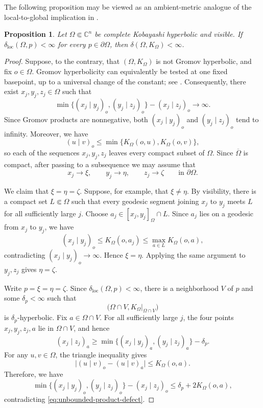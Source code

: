\documentclass[11pt]{article}
\newtheorem{proposition}[theorem]{Proposition}
\theoremstyle{definition}
\newcommand{\C}{\mathbb{C}}
\begin{document}
The following proposition may be viewed as an ambient-metric analogue
of the local-to-global implication in
\cite[Theorem~1.2]{BracciGaussierNikolovThomas}.
\begin{proposition}\label{prop:visible-local-to-global}
Let \(\Omega\Subset\C^n\) be complete Kobayashi hyperbolic and visible.
If \(\delta_{\mathrm{loc}}(\Omega,p)<\infty\) for every
\(p\in\partial\Omega\), then \(\delta(\Omega,K_\Omega)<\infty\).
\end{proposition}

\begin{proof}
Suppose, to the contrary, that \((\Omega,K_\Omega)\) is not Gromov
hyperbolic, and fix \(o\in\Omega\).
Gromov hyperbolicity can equivalently be tested at one fixed basepoint,
up to a universal change of the constant; see
\cite[Chapter~III.H]{BridsonHaefliger}.
Consequently, there exist \(x_j,y_j,z_j\in\Omega\) such that
\begin{equation}\label{eq:unbounded-product-defect}
\min\{(x_j\mid y_j)_o,(y_j\mid z_j)_o\}
-
(x_j\mid z_j)_o
\longrightarrow\infty.
\end{equation}
Since Gromov products are nonnegative, both
\((x_j\mid y_j)_o\) and \((y_j\mid z_j)_o\) tend to infinity.  Moreover, we have
\[
(u\mid v)_o
\le
\min\{K_\Omega(o,u),K_\Omega(o,v)\},
\]
so each of the sequences \(x_j,y_j,z_j\) leaves every compact subset of
\(\Omega\).  Since \(\overline\Omega\) is compact, after passing to a
subsequence we may assume that
\[
x_j\to\xi,\qquad
y_j\to\eta,\qquad
z_j\to\zeta
\qquad
\text{in }\partial\Omega.
\]

We claim that \(\xi=\eta=\zeta\).
Suppose, for example, that \(\xi\ne\eta\).  By visibility, there is a
compact set \(L\Subset\Omega\) such that every geodesic segment joining
\(x_j\) to \(y_j\) meets \(L\) for all sufficiently large \(j\).
Choose \(a_j\in[x_j,y_j]_\Omega\cap L\).
Since \(a_j\) lies on a geodesic from \(x_j\) to \(y_j\), we have
\[
(x_j\mid y_j)_o
\le
K_\Omega(o,a_j)
\le
\max_{a\in L}K_\Omega(o,a),
\]
contradicting \((x_j\mid y_j)_o\to\infty\).  Hence
\(\xi=\eta\).  Applying the same argument to \(y_j,z_j\) gives
\(\eta=\zeta\).

Write \(p=\xi=\eta=\zeta\).
Since \(\delta_{\mathrm{loc}}(\Omega,p)<\infty\), there is a
neighborhood \(V\) of \(p\) and some \(\delta_p<\infty\) such that
\[
\bigl(
\Omega\cap V,
\left.K_\Omega\right|_{\Omega\cap V}
\bigr)
\]
is \(\delta_p\)-hyperbolic.  Fix \(a\in\Omega\cap V\).  For all
sufficiently large \(j\), the four points
\(x_j,y_j,z_j,a\) lie in \(\Omega\cap V\), and hence
\[
(x_j\mid z_j)_a
\ge
\min\{(x_j\mid y_j)_a,(y_j\mid z_j)_a\}
-\delta_p.
\]
For any \(u,v\in\Omega\), the triangle inequality gives
\[
\bigl|(u\mid v)_o-(u\mid v)_a\bigr|
\le
K_\Omega(o,a).
\]
Therefore, we have
\[
\min\{(x_j\mid y_j)_o,(y_j\mid z_j)_o\}
-
(x_j\mid z_j)_o
\le
\delta_p+2K_\Omega(o,a),
\]
contradicting \eqref{eq:unbounded-product-defect}.
\end{proof}
\end{document}
